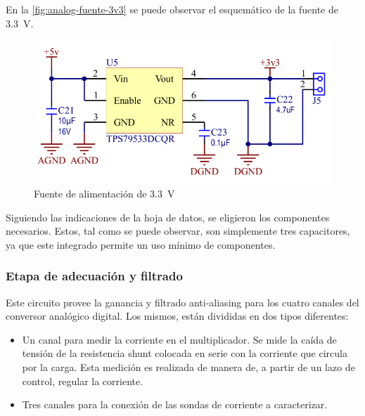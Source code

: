 \documentclass[titlepage, 12pt]{article}
\begin{document}
      En la \autoref{fig:analog-fuente-3v3} se puede observar el esquemático de la fuente de \SI{3.3}{V}.

          \begin{figure}[!htbp]
              \centering
              \includegraphics[scale=0.5]{images/analog-fuente-3v3.png}
              \caption{Fuente de alimentación de \SI{3.3}{V}}
              \label{fig:analog-fuente-3v3}
          \end{figure}

      Siguiendo las indicaciones de la hoja de datos, se eligieron los componentes necesarios. Estos, tal como se puede observar, son simplemente tres capacitores, ya que este integrado permite un uso mínimo de componentes.

\subsubsection{Etapa de adecuación y filtrado}
\label{sec:adecuacion}
Este circuito provee la ganancia y filtrado anti-aliasing para los cuatro canales del conversor analógico digital. Los mismos, están divididas en dos tipos diferentes:
    \begin{itemize}
        \item Un canal para medir la corriente en el multiplicador. Se mide la caída de tensión de la resistencia shunt colocada en serie con la corriente que circula por la carga. Esta medición es realizada de manera de, a partir de un lazo de control, regular la corriente.
        \item Tres canales para la conexión de las sondas de corriente a caracterizar.
    \end{itemize}
\end{document}
